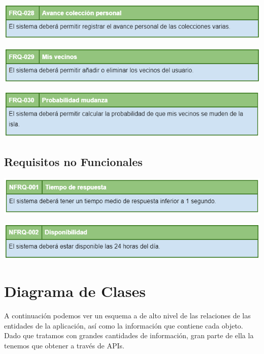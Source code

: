 	\bigskip
	
	\includegraphics[width=\textwidth]{img/cap5/FR/28.png}
	
	\bigskip
	
	\includegraphics[width=\textwidth]{img/cap5/FR/29.png}
	
	\bigskip
	
	\includegraphics[width=\textwidth]{img/cap5/FR/30.png}

	\subsection{Requisitos no Funcionales}
	
	\bigskip
	
	\includegraphics[width=\textwidth]{img/cap5/NFR/1.png}
	
	\bigskip
	
	\includegraphics[width=\textwidth]{img/cap5/NFR/2.png}
	
	\clearpage
	
\section{Diagrama de Clases}

	A continuación podemos ver un esquema a de alto nivel de las relaciones de las entidades de la aplicación, así como la información que contiene cada objeto. Dado que tratamos con grandes cantidades de información, gran parte de ella la tenemos que obtener a través de APIs.\\
	
